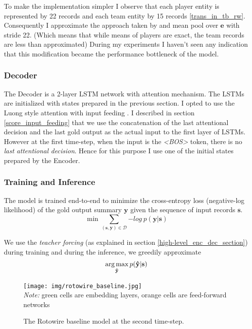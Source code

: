 To make the implementation simpler I observe that each player entity is represented by 22 records and each team entity by 15 records \ref{trans_in_tb_rw}.  Consequently I approximate the approach taken by \citep{wiseman2017} and mean pool over $\mathbf{e}$ with stride 22. (Which means that while means of players are exact, the team records are less than approximated) During my experiments I haven't seen any indication that this modification became the performance bottleneck of the model.

\subsubsection{Decoder}

The Decoder is a 2-layer LSTM network with attention mechanism. The LSTMs are initialized with states prepared in the previous section. I opted to use the Luong style attention with input feeding \citep{luong2015effective}. I described in section \ref{score_input_feeding} that we use the concatenation of the last attentional decision and the last gold output as the actual input to the first layer of LSTMs. However at the first time-step, when the input is the \emph{\textless BOS\textgreater} token, there is no \emph{last attentional decision}. Hence for this purpose I use one of the initial states prepared by the Encoder.

\subsubsection{Training and Inference}

The model is trained end-to-end to minimize the cross-entropy loss (negative-log likelihood) of the gold output summary $\mathbf{y}$ given the sequence of input records $\mathbf{s}$.
\begin{equation}
    \min \sum_{(\mathbf{s}, \mathbf{y}) \in \mathcal{D} }{-log\ p(\mathbf{y}|\mathbf{s})}
\end{equation}

We use the \emph{teacher forcing} (as explained in section \ref{high-level_enc_dec_section}) during training and during the inference, we greedily approximate 
\begin{equation}
    \operatorname*{arg\,max}_{\mathbf{\hat{y}}} p(\mathbf{\hat{y}} | \mathbf{s})
\end{equation}

\begin{figure}[!h]
    \centering
    \texttt{[image: img/rotowire\_baseline.jpg]}
    \footnotesize{\\ \textit{Note:} green cells are embedding layers, orange cells are feed-forward networks}
    \caption{\centering The Rotowire baseline model at the second time-step.} \label{rotowire_baseline_vis}
\end{figure}

